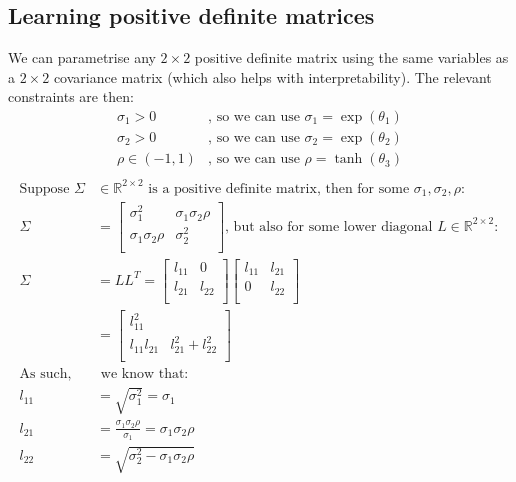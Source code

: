\documentclass[11pt]{article} %
\begin{document}
\subsection{Learning positive definite matrices}
We can parametrise any $2\times2$ positive definite matrix using the same variables as a $2\times2$ covariance matrix (which also helps with interpretability). The relevant constraints are then:
\begin{align}
	\sigma_1 > 0& \textrm{, so we can use } \sigma_1 = \exp(\theta_1)\\
	\sigma_2 > 0& \textrm{, so we can use } \sigma_2 = \exp(\theta_2)\\
	\rho \in (-1, 1) & \textrm{, so we can use } \rho = \tanh(\theta_3)\\
\end{align}
\begin{align*}
	\textrm{Suppose $\Sigma$}&\textrm{$\in\mathbb{R}^{2\times2}$ is a positive definite matrix, then for some } \sigma_1, \sigma_2, \rho:\\
	\Sigma &= \begin{bmatrix}
 \sigma_1^2 & \sigma_1\sigma_2\rho \\
  \sigma_1\sigma_2\rho & \sigma_2^2 \\
\end{bmatrix}\textrm{, but also for some lower diagonal }L\in\mathbb{R}^{2\times2}:\\
\Sigma &= LL^T = \begin{bmatrix}
 l_{11} & 0 \\
  l_{21} & l_{22} \\
\end{bmatrix}\begin{bmatrix}
 l_{11} & l_{21} \\
  0 & l_{22} \\
\end{bmatrix}\\
&=\begin{bmatrix}
 l_{11}^2 &  \\
  l_{11}l_{21} & l_{21}^2 + l_{22}^2 \\
\end{bmatrix}\\
\textrm{As such,}&\textrm{ we know that:}\\
	l_{11} &= \sqrt{\sigma_1^2} =\sigma_1\\
	l_{21} &= \frac{\sigma_1\sigma_2\rho}{\sigma_1}=\sigma_1\sigma_2\rho \\
	l_{22} &= \sqrt{\sigma_2^2 - \sigma_1\sigma_2\rho}
\end{align*}
	
\end{document}
